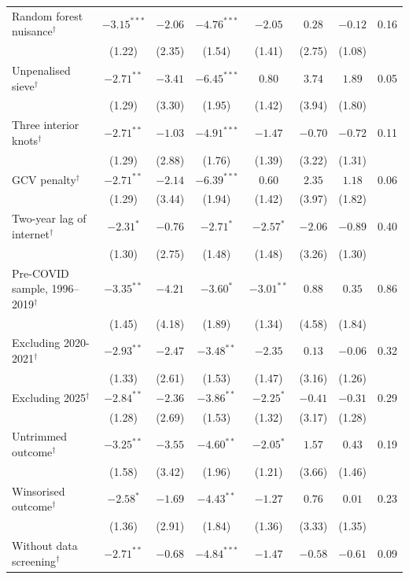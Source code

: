 \documentclass[pdflatex,sn-basic]{sn-jnl}%
\theoremstyle{thmstyleone}
\theoremstyle{thmstyletwo}
\renewenvironment{table}[1][]{\begin{tableorg}[#1]\centering\tablebodyfont}{\end{tableorg}}
\begin{document}
\begin{appendices}
\begin{table}[!p]
{\begin{threeparttable}
\begin{tabular}{lccccccc}
\quad Random forest nuisance$^{\dagger}$ & $-3.15^{***}$ & $-2.06$ & $-4.76^{***}$ & $-2.05$ & $0.28$ & $-0.12$ & 0.16\\
 & (1.22) & (2.35) & (1.54) & (1.41) & (2.75) & (1.08) & \\
\quad Unpenalised sieve$^{\dagger}$ & $-2.71^{**}$ & $-3.41$ & $-6.45^{***}$ & $0.80$ & $3.74$ & $1.89$ & 0.05\\
 & (1.29) & (3.30) & (1.95) & (1.42) & (3.94) & (1.80) & \\
\quad Three interior knots$^{\dagger}$ & $-2.71^{**}$ & $-1.03$ & $-4.91^{***}$ & $-1.47$ & $-0.70$ & $-0.72$ & 0.11\\
 & (1.29) & (2.88) & (1.76) & (1.39) & (3.22) & (1.31) & \\
\quad GCV penalty$^{\dagger}$ & $-2.71^{**}$ & $-2.14$ & $-6.39^{***}$ & $0.60$ & $2.35$ & $1.18$ & 0.06\\
 & (1.29) & (3.44) & (1.94) & (1.42) & (3.97) & (1.82) & \\
\quad Two-year lag of internet$^{\dagger}$ & $-2.31^{*}$ & $-0.76$ & $-2.71^{*}$ & $-2.57^{*}$ & $-2.06$ & $-0.89$ & 0.40\\
 & (1.30) & (2.75) & (1.48) & (1.48) & (3.26) & (1.30) & \\
\quad Pre-COVID sample, 1996--2019$^{\dagger}$ & $-3.35^{**}$ & $-4.21$ & $-3.60^{*}$ & $-3.01^{**}$ & $0.88$ & $0.35$ & 0.86\\
 & (1.45) & (4.18) & (1.89) & (1.34) & (4.58) & (1.84) & \\
\quad Excluding 2020-2021$^{\dagger}$ & $-2.93^{**}$ & $-2.47$ & $-3.48^{**}$ & $-2.35$ & $0.13$ & $-0.06$ & 0.32\\
 & (1.33) & (2.61) & (1.53) & (1.47) & (3.16) & (1.26) & \\
\quad Excluding 2025$^{\dagger}$ & $-2.84^{**}$ & $-2.36$ & $-3.86^{**}$ & $-2.25^{*}$ & $-0.41$ & $-0.31$ & 0.29\\
 & (1.28) & (2.69) & (1.53) & (1.32) & (3.17) & (1.28) & \\
\quad Untrimmed outcome$^{\dagger}$ & $-3.25^{**}$ & $-3.55$ & $-4.60^{**}$ & $-2.05^{*}$ & $1.57$ & $0.43$ & 0.19\\
 & (1.58) & (3.42) & (1.96) & (1.21) & (3.66) & (1.46) & \\
\quad Winsorised outcome$^{\dagger}$ & $-2.58^{*}$ & $-1.69$ & $-4.43^{**}$ & $-1.27$ & $0.76$ & $0.01$ & 0.23\\
 & (1.36) & (2.91) & (1.84) & (1.36) & (3.33) & (1.35) & \\
\quad Without data screening$^{\dagger}$ & $-2.71^{**}$ & $-0.68$ & $-4.84^{***}$ & $-1.47$ & $-0.58$ & $-0.61$ & 0.09\\

\end{tabular}
\end{threeparttable}}
\end{table}
\end{appendices}
\end{document}
